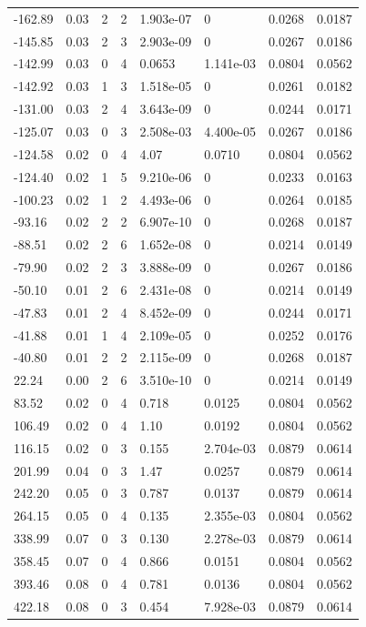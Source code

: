 \documentclass[preview]{standalone}
\begin{document}
{{\begin{tabular}{L{1.2cm}C{1.2cm} C{0.3cm}C{0.5cm} C{1.4cm}C{1.4cm} C{1.4cm}C{1.4cm}}
  -162.89  &  0.03  & 2     &  2 &  1.903e-07  & 0  & 0.0268 &  0.0187   \\ 
  -145.85  &  0.03  & 2     &  3 &  2.903e-09  & 0  & 0.0267 &  0.0186   \\ 
  -142.99  &  0.03  & 0     &  4 &  0.0653  & 1.141e-03  & 0.0804 &  0.0562   \\ 
  -142.92  &  0.03  & 1     &  3 &  1.518e-05  & 0  & 0.0261 &  0.0182   \\ 
  -131.00  &  0.03  & 2     &  4 &  3.643e-09  & 0  & 0.0244 &  0.0171   \\ 
  -125.07  &  0.03  & 0     &  3 &  2.508e-03  & 4.400e-05  & 0.0267 &  0.0186   \\ 
  -124.58  &  0.02  & 0     &  4 &  4.07  & 0.0710  & 0.0804 &  0.0562   \\ 
  -124.40  &  0.02  & 1     &  5 &  9.210e-06  & 0  & 0.0233 &  0.0163   \\ 
  -100.23  &  0.02  & 1     &  2 &  4.493e-06  & 0  & 0.0264 &  0.0185   \\ 
  -93.16  &  0.02  & 2     &  2 &  6.907e-10  & 0  & 0.0268 &  0.0187   \\ 
  -88.51  &  0.02  & 2     &  6 &  1.652e-08  & 0  & 0.0214 &  0.0149   \\ 
  -79.90  &  0.02  & 2     &  3 &  3.888e-09  & 0  & 0.0267 &  0.0186   \\ 
  -50.10  &  0.01  & 2     &  6 &  2.431e-08  & 0  & 0.0214 &  0.0149   \\ 
  -47.83  &  0.01  & 2     &  4 &  8.452e-09  & 0  & 0.0244 &  0.0171   \\ 
  -41.88  &  0.01  & 1     &  4 &  2.109e-05  & 0  & 0.0252 &  0.0176   \\ 
  -40.80  &  0.01  & 2     &  2 &  2.115e-09  & 0  & 0.0268 &  0.0187   \\ 
  22.24  &  0.00  & 2     &  6 &  3.510e-10  & 0  & 0.0214 &  0.0149   \\ 
  83.52  &  0.02  & 0     &  4 &  0.718  & 0.0125  & 0.0804 &  0.0562   \\ 
  106.49  &  0.02  & 0     &  4 &  1.10  & 0.0192  & 0.0804 &  0.0562   \\ 
  116.15  &  0.02  & 0     &  3 &  0.155  & 2.704e-03  & 0.0879 &  0.0614   \\ 
  201.99  &  0.04  & 0     &  3 &  1.47  & 0.0257  & 0.0879 &  0.0614   \\ 
  242.20  &  0.05  & 0     &  3 &  0.787  & 0.0137  & 0.0879 &  0.0614   \\ 
  264.15  &  0.05  & 0     &  4 &  0.135  & 2.355e-03  & 0.0804 &  0.0562   \\ 
  338.99  &  0.07  & 0     &  3 &  0.130  & 2.278e-03  & 0.0879 &  0.0614   \\ 
  358.45  &  0.07  & 0     &  4 &  0.866  & 0.0151  & 0.0804 &  0.0562   \\ 
  393.46  &  0.08  & 0     &  4 &  0.781  & 0.0136  & 0.0804 &  0.0562   \\ 
  422.18  &  0.08  & 0     &  3 &  0.454  & 7.928e-03  & 0.0879 &  0.0614   \\ 
\hline 
\end{tabular} 

}}
\end{document}
